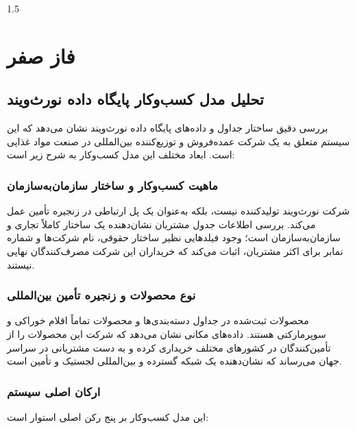 \documentclass[14pt,a4paper]{extarticle}
\begin{document}
	
	\begin{spacing}{1.5}
		\tableofcontents
	\end{spacing}
	
	\clearpage
	
	\setcounter{page}{1}

	\section{فاز صفر}
	\subsection{تحلیل مدل کسب‌وکار پایگاه داده نورث‌ویند}
	
	بررسی دقیق ساختار جداول و داده‌های پایگاه داده نورث‌ویند نشان می‌دهد که این سیستم متعلق به یک شرکت عمده‌فروش و توزیع‌کننده بین‌المللی در صنعت مواد غذایی است. ابعاد مختلف این مدل کسب‌وکار به شرح زیر است:
	
	\subsubsection{ماهیت کسب‌وکار و ساختار سازمان‌به‌سازمان}
	شرکت نورث‌ویند تولیدکننده نیست، بلکه به‌عنوان یک پل ارتباطی در زنجیره تأمین عمل می‌کند. بررسی اطلاعات جدول مشتریان نشان‌دهنده یک ساختار کاملاً تجاری و سازمان‌به‌سازمان است؛ وجود فیلدهایی نظیر ساختار حقوقی، نام شرکت‌ها و شماره نمابر برای اکثر مشتریان، اثبات می‌کند که خریداران این شرکت مصرف‌کنندگان نهایی نیستند.
	
	\subsubsection{نوع محصولات و زنجیره تأمین بین‌المللی}
	محصولات ثبت‌شده در جداول دسته‌بندی‌ها و محصولات تماماً اقلام خوراکی و سوپرمارکتی هستند. داده‌های مکانی نشان می‌دهد که شرکت این محصولات را از تأمین‌کنندگان در کشورهای مختلف خریداری کرده و به دست مشتریانی در سراسر جهان می‌رساند که نشان‌دهنده یک شبکه گسترده و بین‌المللی لجستیک و تأمین است.
	
	\subsubsection{ارکان اصلی سیستم}
	این مدل کسب‌وکار بر پنج رکن اصلی استوار است:
	
\end{document}
